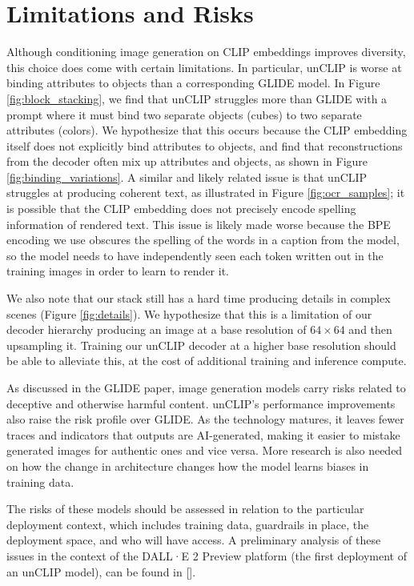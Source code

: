 \section{Limitations and Risks}
\label{sec:limitations}
Although conditioning image generation on CLIP embeddings improves diversity, this choice does come with certain limitations. In particular, unCLIP is worse at binding attributes to objects than a corresponding GLIDE model. In Figure \ref{fig:block_stacking}, we find that unCLIP struggles more than GLIDE with a prompt where it must bind two separate objects (cubes) to two separate attributes (colors). We hypothesize that this occurs because the CLIP embedding itself does not explicitly bind attributes to objects, and find that reconstructions from the decoder often mix up attributes and objects, as shown in Figure \ref{fig:binding_variations}. A similar and likely related issue is that unCLIP struggles at producing coherent text, as illustrated in Figure \ref{fig:ocr_samples}; it is possible that the CLIP embedding does not precisely encode spelling information of rendered text. This issue is likely made worse because the BPE encoding we use obscures the spelling of the words in a caption from the model, so the model needs to have independently seen each token written out in the training images in order to learn to render it.

We also note that our stack still has a hard time producing details in complex scenes (Figure \ref{fig:details}). We hypothesize that this is a limitation of our decoder hierarchy producing an image at a base resolution of $64 \times 64$ and then upsampling it. Training our unCLIP decoder at a higher base resolution should be able to alleviate this, at the cost of additional training and inference compute. 

As discussed in the GLIDE paper, image generation models carry risks related to deceptive and otherwise harmful content. unCLIP's performance improvements also raise the risk profile over GLIDE. As the technology matures, it leaves fewer traces and indicators that outputs are AI-generated, making it easier to mistake generated images for authentic ones and vice versa. More research is also needed on how the change in architecture changes how the model learns biases in training data.

The risks of these models should be assessed in relation to the particular deployment context, which includes training data, guardrails in place, the deployment space, and who will have access. A preliminary analysis of these issues in the context of the DALL·E 2 Preview platform (the first deployment of an unCLIP model), can be found in \citeauthor{mishkin2022risks} [].


